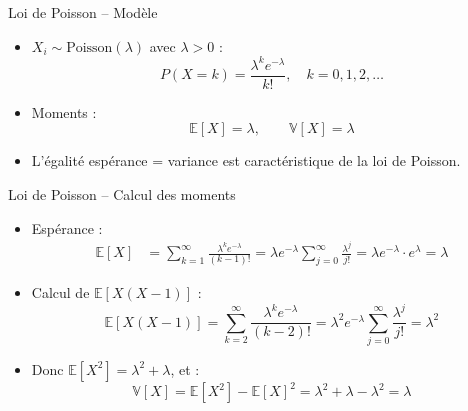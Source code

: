 \documentclass[11pt,aspectratio=169]{beamer}
\begin{document}
\begin{frame}{Loi de Poisson -- Modèle}

\begin{itemize}

\item $X_i \sim \text{Poisson}(\lambda)$ avec $\lambda > 0$ :
  \[
  P(X = k) = \frac{\lambda^k e^{-\lambda}}{k!}, \quad k = 0, 1, 2, \ldots
  \]

\item Moments :
  \[
  \mathbb{E}[X] = \lambda, \qquad \mathbb{V}[X] = \lambda
  \]

\item L'égalité espérance = variance est caractéristique de la loi de Poisson.

\end{itemize}

\end{frame}


\begin{frame}{Loi de Poisson -- Calcul des moments}

\begin{itemize}

\item Espérance :
  \begin{align*}
  \mathbb{E}[X] &= \sum_{k=1}^{\infty} \frac{\lambda^k e^{-\lambda}}{(k-1)!} = \lambda e^{-\lambda} \sum_{j=0}^{\infty} \frac{\lambda^{j}}{j!} = \lambda e^{-\lambda} \cdot e^{\lambda} = \boxed{\lambda}
  \end{align*}

\item Calcul de $\mathbb{E}[X(X-1)]$ :
  \[
  \mathbb{E}[X(X-1)] = \sum_{k=2}^{\infty} \frac{\lambda^k e^{-\lambda}}{(k-2)!} = \lambda^2 e^{-\lambda} \sum_{j=0}^{\infty} \frac{\lambda^j}{j!} = \lambda^2
  \]

\item Donc $\mathbb{E}[X^2] = \lambda^2 + \lambda$, et :
  \[
  \mathbb{V}[X] = \mathbb{E}[X^2] - \mathbb{E}[X]^2 = \lambda^2 + \lambda - \lambda^2 = \boxed{\lambda}
  \]

\end{itemize}

\end{frame}
\end{document}
